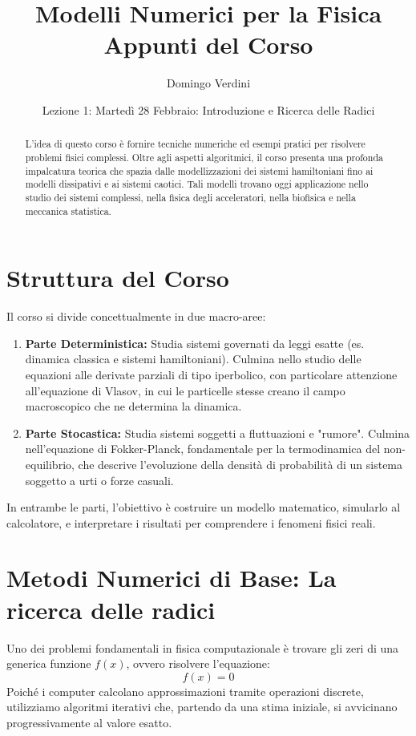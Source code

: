 \documentclass[12pt,a4paper]{article}
\title{Modelli Numerici per la Fisica\\ \large Appunti del Corso}
\author{Domingo Verdini}
\date{Lezione 1: Martedì 28 Febbraio: Introduzione e Ricerca delle Radici}
\begin{document}
\maketitle

\begin{abstract}
L'idea di questo corso è fornire tecniche numeriche ed esempi pratici per risolvere problemi fisici complessi. Oltre agli aspetti algoritmici, il corso presenta una profonda impalcatura teorica che spazia dalle modellizzazioni dei sistemi hamiltoniani fino ai modelli dissipativi e ai sistemi caotici. Tali modelli trovano oggi applicazione nello studio dei sistemi complessi, nella fisica degli acceleratori, nella biofisica e nella meccanica statistica.
\end{abstract}

\section*{Struttura del Corso}
Il corso si divide concettualmente in due macro-aree:
\begin{enumerate}
    \item \textbf{Parte Deterministica:} Studia sistemi governati da leggi esatte (es. dinamica classica e sistemi hamiltoniani). Culmina nello studio delle equazioni alle derivate parziali di tipo iperbolico, con particolare attenzione all'equazione di Vlasov, in cui le particelle stesse creano il campo macroscopico che ne determina la dinamica.
    \item \textbf{Parte Stocastica:} Studia sistemi soggetti a fluttuazioni e "rumore". Culmina nell'equazione di Fokker-Planck, fondamentale per la termodinamica del non-equilibrio, che descrive l'evoluzione della densità di probabilità di un sistema soggetto a urti o forze casuali.
\end{enumerate}
In entrambe le parti, l'obiettivo è costruire un modello matematico, simularlo al calcolatore, e interpretare i risultati per comprendere i fenomeni fisici reali.
\section{Metodi Numerici di Base: La ricerca delle radici}

Uno dei problemi fondamentali in fisica computazionale è trovare gli zeri di una generica funzione $f(x)$, ovvero risolvere l'equazione:
\begin{equation}
f(x) = 0
\end{equation}
Poiché i computer calcolano approssimazioni tramite operazioni discrete, utilizziamo algoritmi iterativi che, partendo da una stima iniziale, si avvicinano progressivamente al valore esatto.
\end{document}
